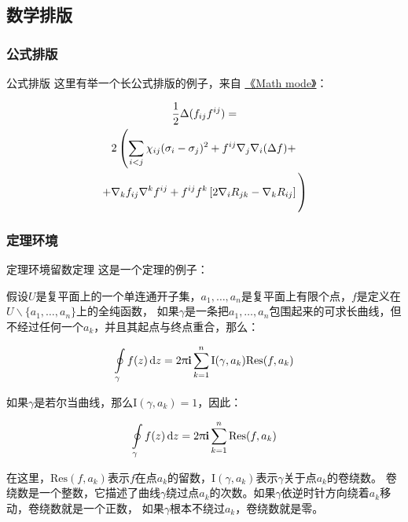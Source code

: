 \subsection{数学排版}
\label{sec:matheq}

\subsubsection{公式排版}
\label{sec:eqformat}
\begin{frame}{公式排版}
这里有举一个长公式排版的例子，来自 \href{http://www.tex.ac.uk/tex-archive/info/math/voss/mathmode/Mathmode.pdf}{《Math mode》}：

\begin{multline}
  \frac {1}{2}\Delta (f_{ij}f^{ij})= \\
  2\left (\sum _{i<j}\chi _{ij}(\sigma _{i}-
    \sigma _{j}) ^{2}+ f^{ij}\nabla _{j}\nabla _{i}(\Delta f)+\right .\\
  \left .+\nabla _{k}f_{ij}\nabla ^{k}f^{ij}+
    f^{ij}f^{k}\left [2\nabla _{i}R_{jk}-
      \nabla _{k}R_{ij}\right ]\vphantom {\sum _{i<j}}\right )
\end{multline}
\end{frame}

\subsubsection{定理环境}
\begin{frame}{定理环境}{留数定理}
这是一个定理的例子：
\begin{thm}[留数定理]
\label{thm:res}
  假设$U$是复平面上的一个单连通开子集，$a_1,\ldots,a_n$是复平面上有限个点，$f$是定义在$U\backslash \{a_1,\ldots,a_n\}$上的全纯函数，
  如果$\gamma$是一条把$a_1,\ldots,a_n$包围起来的可求长曲线，但不经过任何一个$a_k$，并且其起点与终点重合，那么：

  \begin{equation}
    \label{eq:res}
    \ointop_{\gamma}f(z)\,\mathrm{d}z = 2\uppi\mathbf{i}\sum^n_{k=1}
    \mathrm{I}(\gamma,a_k)\mathrm{Res}(f,a_k)
  \end{equation}

  如果$\gamma$是若尔当曲线，那么$\mathrm{I}(\gamma, a_k)=1$，因此：

  \begin{equation}
    \label{eq:resthm}
    \ointop_{\gamma}f(z)\,\mathrm{d}z = 2\uppi\mathbf{i}\sum^n_{k=1}
    \mathrm{Res}(f,a_k)
  \end{equation}


  在这里，$\mathrm{Res}(f, a_k)$表示$f$在点$a_k$的留数，$\mathrm{I}(\gamma,a_k)$表示$\gamma$关于点$a_k$的卷绕数。
  卷绕数是一个整数，它描述了曲线$\gamma$绕过点$a_k$的次数。如果$\gamma$依逆时针方向绕着$a_k$移动，卷绕数就是一个正数，
  如果$\gamma$根本不绕过$a_k$，卷绕数就是零。
\end{thm}
\end{frame}

